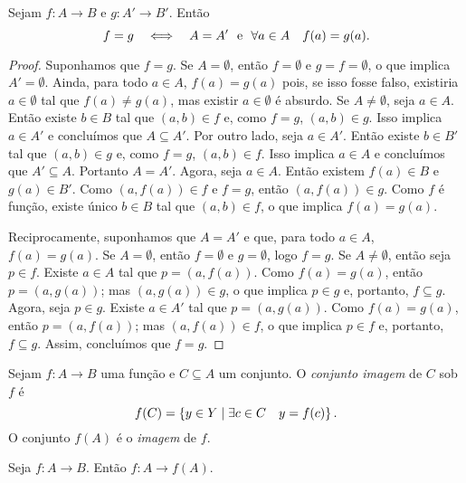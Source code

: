 \begin{proposition}\label{conj:prop.func.ig}
Sejam $f: A \to B$ e $g:A' \to B'$. Então
	\begin{equation*}
	f=g \quad \Longleftrightarrow \quad A=A' \text{\ \ e\ \ } \forall a \in A \quad f(a)=g(a).
	\end{equation*}
\end{proposition}
\begin{proof}
Suponhamos que $f=g$. Se $A=\emptyset$, então $f=\emptyset$ e $g=f=\emptyset$, o que implica $A'=\emptyset$. Ainda, para todo $a \in A$, $f(a)=g(a)$ pois, se isso fosse falso, existiria $a \in \emptyset$ tal que $f(a)\neq g(a)$, mas existir $a \in \emptyset$ é absurdo. Se $A \neq \emptyset$, seja $a \in A$. Então existe $b \in B$ tal que $(a,b) \in f$ e, como $f=g$, $(a,b) \in g$. Isso implica $a \in A'$ e concluímos que $A \subseteq A'$. Por outro lado, seja $a \in A'$. Então existe $b \in B'$ tal que $(a,b) \in g$ e, como $f=g$, $(a,b) \in f$. Isso implica $a \in A$ e concluímos que $A' \subseteq A$. Portanto $A=A'$. Agora, seja $a \in A$. Então existem $f(a) \in B$ e $g(a) \in B'$. Como $(a,f(a)) \in f$ e $f=g$, então $(a,f(a)) \in g$. Como $f$ é função, existe único $b \in B$ tal que $(a,b) \in f$, o que implica $f(a)=g(a)$.
	
Reciprocamente, suponhamos que $A=A'$ e que, para todo $a \in A$, $f(a)=g(a)$. Se $A=\emptyset$, então $f=\emptyset$ e $g=\emptyset$, logo $f=g$. Se $A \neq \emptyset$, então seja $p \in f$. Existe $a \in A$ tal que $p=(a,f(a))$. Como $f(a)=g(a)$, então $p=(a,g(a))$; mas $(a,g(a)) \in g$, o que implica $p \in g$ e, portanto, $f \subseteq g$. Agora, seja $p \in g$. Existe $a \in A'$ tal que $p=(a,g(a))$. Como $f(a)=g(a)$, então $p=(a,f(a))$; mas $(a,f(a)) \in f$, o que implica $p \in f$ e, portanto, $f \subseteq g$. Assim, concluímos que $f=g$.
\end{proof}

\begin{definition}
Sejam $f: A \to B$ uma função e $C \subseteq A$ um conjunto. O \emph{conjunto imagem} de $C$ sob $f$ é
	\begin{equation*}
	f(C)=\left\{{y \in Y}\;\middle\vert\;{\exists c \in C \quad y=f(c)}\right\}.
	\end{equation*}
O conjunto $f(A)$ é o \emph{imagem} de $f$.
\end{definition}

\begin{proposition}
Seja $f: A \to B$. Então $f: A \to f(A)$.
\end{proposition}

